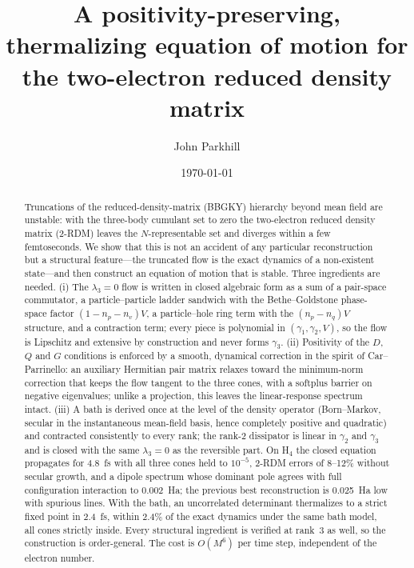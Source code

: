 \documentclass[aip,jcp,reprint,floatfix,superscriptaddress]{revtex4-2}
\begin{document}
\title{A positivity-preserving, thermalizing equation of motion for the two-electron reduced density matrix}

\author{John Parkhill}

\date{\today}

\begin{abstract}
Truncations of the reduced-density-matrix (BBGKY) hierarchy beyond mean field are unstable: with the three-body cumulant set to zero the two-electron reduced density matrix (2-RDM) leaves the $N$-representable set and diverges within a few femtoseconds. We show that this is not an accident of any particular reconstruction but a structural feature---the truncated flow is the exact dynamics of a non-existent state---and then construct an equation of motion that is stable. Three ingredients are needed. (i) The $\lambda_3=0$ flow is written in closed algebraic form as a sum of a pair-space commutator, a particle--particle ladder sandwich with the Bethe--Goldstone phase-space factor $(1-n_p-n_v)V$, a particle--hole ring term with the $(n_p-n_q)V$ structure, and a contraction term; every piece is polynomial in $(\gamma_1,\gamma_2,V)$, so the flow is Lipschitz and extensive by construction and never forms $\gamma_3$. (ii) Positivity of the $D$, $Q$ and $G$ conditions is enforced by a smooth, dynamical correction in the spirit of Car--Parrinello: an auxiliary Hermitian pair matrix relaxes toward the minimum-norm correction that keeps the flow tangent to the three cones, with a softplus barrier on negative eigenvalues; unlike a projection, this leaves the linear-response spectrum intact. (iii) A bath is derived once at the level of the density operator (Born--Markov, secular in the instantaneous mean-field basis, hence completely positive and quadratic) and contracted consistently to every rank; the rank-2 dissipator is linear in $\gamma_2$ and $\gamma_3$ and is closed with the same $\lambda_3=0$ as the reversible part. On H$_4$ the closed equation propagates for 4.8~fs with all three cones held to $10^{-5}$, 2-RDM errors of 8--12\% without secular growth, and a dipole spectrum whose dominant pole agrees with full configuration interaction to 0.002~Ha; the previous best reconstruction is 0.025~Ha low with spurious lines. With the bath, an uncorrelated determinant thermalizes to a strict fixed point in 2.4~fs, within 2.4\% of the exact dynamics under the same bath model, all cones strictly inside. Every structural ingredient is verified at rank~3 as well, so the construction is order-general. The cost is $O(M^6)$ per time step, independent of the electron number.
\end{abstract}
\end{document}
